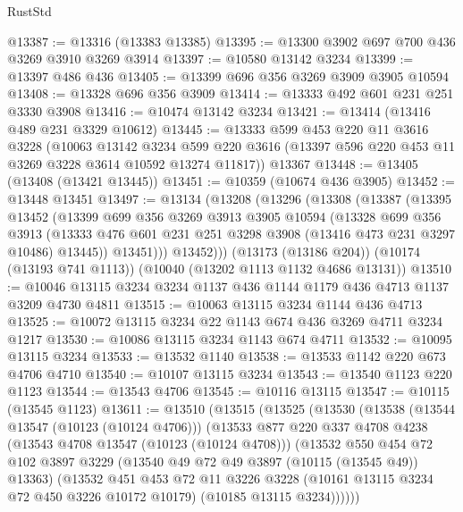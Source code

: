 \begin{lexlean}{RustStd}
\begin{coremodule}
@13387 := @13316 (@13383 @13385)
@13395 := @13300 @3902 @697 @700 @436 @3269 @3910 @3269 @3914
@13397 := @10580 @13142 @3234
@13399 := @13397 @486 @436
@13405 := @13399 @696 @356 @3269 @3909 @3905 @10594
@13408 := @13328 @696 @356 @3909
@13414 := @13333 @492 @601 @231 @251 @3330 @3908
@13416 := @10474 @13142 @3234
@13421 := @13414 (@13416 @489 @231 @3329 @10612)
@13445 := @13333
    @599
    @453
    @220
    @11
    @3616
    @3228
    (@10063
      @13142
      @3234
      @599
      @220
      @3616
      (@13397 @596 @220 @453 @11 @3269 @3228 @3614 @10592 @13274 @11817))
    @13367
@13448 := @13405 (@13408 (@13421 @13445))
@13451 := @10359 (@10674 @436 @3905)
@13452 := @13448 @13451
@13497 := @13134
    (@13208
      (@13296
        (@13308
          (@13387
            (@13395
              @13452
              (@13399
                @699
                @356
                @3269
                @3913
                @3905
                @10594
                (@13328
                  @699
                  @356
                  @3913
                  (@13333 @476 @601 @231 @251 @3298 @3908 (@13416 @473 @231 @3297 @10486) @13445))
                @13451)))
          @13452)))
    (@13173 (@13186 @204))
    (@10174 (@13193 @741 @1113))
    (@10040 (@13202 @1113 @1132 @4686 @13131))
@13510 := @10046 @13115 @3234 @3234 @1137 @436 @1144 @1179 @436 @4713 @1137 @3209 @4730 @4811
@13515 := @10063 @13115 @3234 @1144 @436 @4713
@13525 := @10072 @13115 @3234 @22 @1143 @674 @436 @3269 @4711 @3234 @1217
@13530 := @10086 @13115 @3234 @1143 @674 @4711
@13532 := @10095 @13115 @3234
@13533 := @13532 @1140
@13538 := @13533 @1142 @220 @673 @4706 @4710
@13540 := @10107 @13115 @3234
@13543 := @13540 @1123 @220 @1123
@13544 := @13543 @4706
@13545 := @10116 @13115
@13547 := @10115 (@13545 @1123)
@13611 := @13510
    (@13515
      (@13525
        (@13530
          (@13538
            (@13544 @13547 (@10123 (@10124 @4706)))
            (@13533
              @877
              @220
              @337
              @4708
              @4238
              (@13543 @4708 @13547 (@10123 (@10124 @4708)))
              (@13532
                @550
                @454
                @72
                @102
                @3897
                @3229
                (@13540 @49 @72 @49 @3897 (@10115 (@13545 @49)) @13363)
                (@13532
                  @451
                  @453
                  @72
                  @11
                  @3226
                  @3228
                  (@10161 @13115 @3234 @72 @450 @3226 @10172 @10179)
                  (@10185 @13115 @3234))))))

\end{coremodule}
\end{lexlean}
